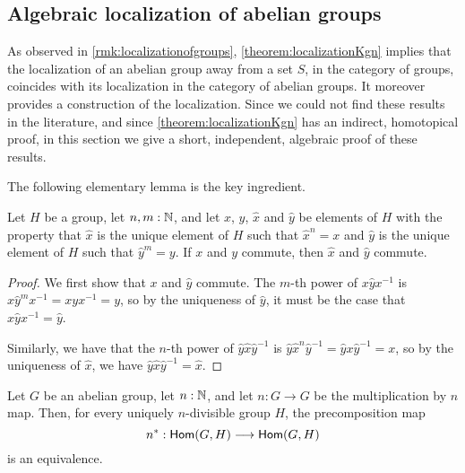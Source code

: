 \subsection{Algebraic localization of abelian groups}\label{ss:abelian}

As observed in \cref{rmk:localizationofgroups},
\cref{theorem:localizationKgn} implies that the localization of an abelian group
away from a set $S$, in the category of groups, coincides with its localization in
the category of abelian groups. It moreover provides a construction of the localization.
Since we could not find these results in the literature, and since \cref{theorem:localizationKgn}
has an indirect, homotopical proof, in this section we give a short, independent, algebraic proof
of these results.

The following elementary lemma is the key ingredient.
 
\begin{lem}
    Let $H$ be a group, let $n,m : \mathbb{N}$, and let $x$, $y$, $\hat{x}$ and $\hat{y}$ be
    elements of $H$ with the property that
    $\hat{x}$ is the unique element of $H$ such that $\hat{x}^n = x$ and
    $\hat{y}$ is the unique element of $H$ such that $\hat{y}^m = y$.
    If $x$ and $y$ commute, then $\hat{x}$ and $\hat{y}$ commute.
\end{lem}

\begin{proof}
    We first show that $x$ and $\hat{y}$ commute.
    The $m$-th power of $x \hat{y} x^{-1}$ is $x \hat{y}^m x^{-1} = x y x^{-1} = y$,
    so by the uniqueness of $\hat{y}$, it must be the case that $x \hat{y} x^{-1} = \hat{y}$.

    Similarly, we have that
    the $n$-th power of $\hat{y} \hat{x} \hat{y}^{-1}$ is
    $\hat{y} \hat{x}^n \hat{y}^{-1} = \hat{y} x \hat{y}^{-1} = x$,
    so by the uniqueness of $\hat{x}$, we have $\hat{y} \hat{x} \hat{y}^{-1} = \hat{x}$.
\end{proof}

\begin{prp}
    Let $G$ be an abelian group, let $n : \mathbb{N}$, and let $n : G \to G$ be the multiplication by $n$ map.
    Then, for every uniquely $n$-divisible group $H$, the precomposition map
    \[
        n^* : \mathsf{Hom}(G,H) \longrightarrow \mathsf{Hom}(G,H)
    \]
    is an equivalence.
\end{prp}

